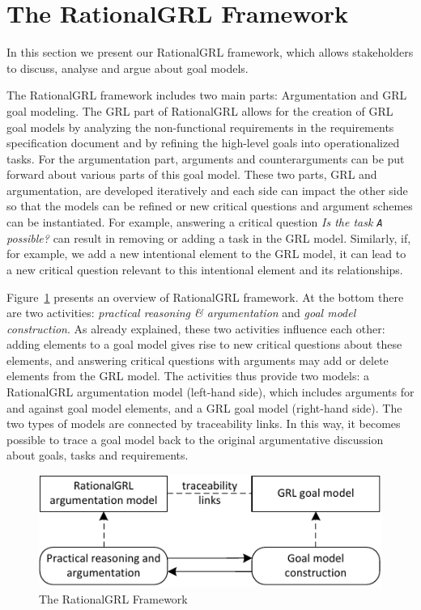 \section{The RationalGRL Framework}
\label{sect:overview}

In this section we present our RationalGRL framework, which allows stakeholders to discuss, analyse and argue about goal models. 

The RationalGRL framework includes two main parts: Argumentation and GRL goal modeling. The GRL part of RationalGRL allows for the creation of GRL goal models by analyzing the non-functional requirements in the requirements specification document and by refining the high-level goals into operationalized tasks. For the argumentation part, arguments and counterarguments can be put forward about various parts of this goal model. These two parts, GRL and argumentation, are developed iteratively and each side can impact the other side so that the models can be refined or new critical questions and argument schemes can be instantiated. For example, answering a critical question \emph{Is the task \texttt{A} possible?} can result in removing or adding a task in the GRL model. Similarly,  if, for example, we add a new intentional element to the GRL model, it can lead to a new critical question relevant to this intentional element and its relationships.  

Figure~\ref{fig:rationalgrl-framework} presents an overview of RationalGRL framework. At the bottom there are two activities: \emph{practical reasoning \& argumentation} and \emph{goal model construction}. As already explained, these two activities influence each other: adding elements to a goal model gives rise to new critical questions about these elements, and answering critical questions with arguments may add or delete elements from the GRL model. The activities thus provide two models: a RationalGRL argumentation model (left-hand side), which includes arguments for and against goal model elements, and a GRL goal model (right-hand side). The two types of models are connected by traceability links. In this way, it becomes possible to trace a goal model back to the original argumentative discussion about goals, tasks and requirements.

\begin{figure}[t]
\centering
\includegraphics[width=\columnwidth]{img/framework.pdf}
\caption{The RationalGRL Framework}
\label{fig:rationalgrl-framework}
\end{figure}

